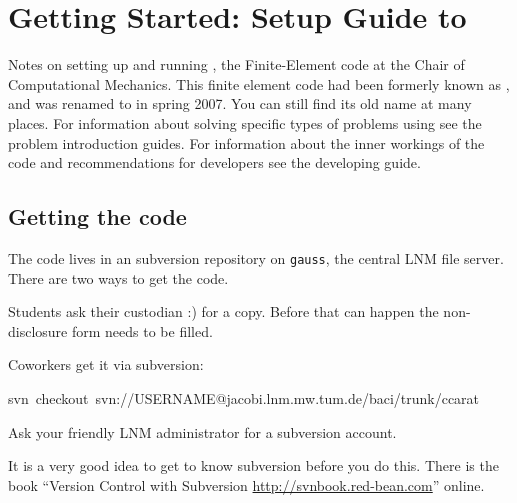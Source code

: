 
\makeatletter
\newenvironment{lyxcode}
{\begin{list}{}{
\setlength{\rightmargin}{\leftmargin}
\setlength{\listparindent}{0pt}%
\raggedright
\setlength{\itemsep}{0pt}
\setlength{\parsep}{0pt}
\normalfont\ttfamily}%
 \item[]}
{\end{list}}
\newenvironment{lyxlist}[1]
{\begin{list}{}
{\settowidth{\labelwidth}{#1}
 \setlength{\leftmargin}{\labelwidth}
 \addtolength{\leftmargin}{\labelsep}
 \renewcommand{\makelabel}[1]{##1\hfil}}}
{\end{list}}

\makeatother

\newcommand{\gauss}{{\tt gauss}}


\chapter{Getting Started: Setup Guide to \baci{}}


Notes on setting up and running \baci{}, the Finite-Element code
at the Chair of Computational Mechanics. This finite element code had been
formerly known as \ccarat{}, and was renamed to \baci{} in spring 2007. You
can still find its old name at many places.
For information about solving specific types of problems using \baci{}
see the problem introduction guides. For information about the inner
workings of the code and recommendations for developers see the developing
guide.


\section{Getting the code}

The \baci{} code lives in an subversion repository on \gauss{},
the central LNM file server. There are two ways to get the code.

\begin{itemize}
\item Students ask their custodian :) for a copy. Before that can happen
the non-disclosure form needs to be filled.
\item Coworkers get it via subversion:

\begin{lyxcode}
svn~checkout~svn://USERNAME@jacobi.lnm.mw.tum.de/baci/trunk/ccarat
\end{lyxcode}
Ask your friendly LNM administrator for a subversion account.

It is a very good idea to get to know subversion before you do this.
There is the book {}``Version Control with Subversion \url{http://svnbook.red-bean.com}''
online.

\end{itemize}

